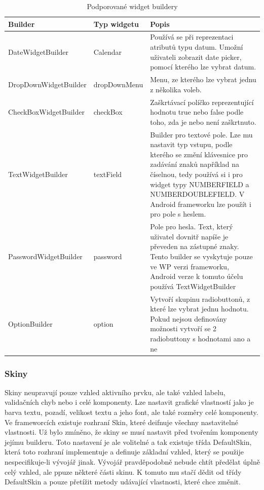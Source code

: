 \begin{table}[h!]
\begin{center}
\caption{Podporované widget buildery}
\label{table:widgetBuilders}
\begin{tabular}{|p{4cm}|p{3cm}|p{7cm}|}
\hline
\textbf{Builder} & \textbf{Typ widgetu} & \textbf{Popis} \\
\hline
DateWidgetBuilder & 
Calendar & Používá se při reprezentaci atributů typu datum. Umožní uživateli zobrazit date picker, pomocí kterého lze vybrat datum. \\
\hline
DropDownWidgetBuilder &
dropDownMenu & Menu, ze kterého lze vybrat jednu z několika voleb. \\
\hline
CheckBoxWidgetBuilder & checkBox &
Zaškrtávací políčko reprezentující hodnotu true nebo false podle toho, zda je nebo není zaškrtnuto. \\
\hline
TextWidgetBuilder & textField &
Builder pro textové pole. Lze mu nastavit typ vstupu, podle kterého se změní klávesnice pro zadávání znaků například na číselnou, tedy používá si i pro widget typy NUMBERFIELD a NUMBERDOUBLEFIELD. V Android frameworku lze použít i pro pole s heslem. \\
\hline
PasswordWidgetBuilder & password &
Pole pro hesla. Text, který uživatel dovnitř napíše je převeden na zástupné znaky. Tento builder se vyskytuje pouze ve WP verzi frameworku, Android verze k tomuto účelu používá TextWidgetBuilder \\
\hline
OptionBuilder & option &
Vytvoří skupinu radiobuttonů, z které lze vybrat jednu hodnotu. Pokud nejsou definovány možnosti vytvoří se 2 radiobuttony s hodnotami ano a ne \\
\hline
\end{tabular}
\end{center}
\end{table}

\subsubsection{Skiny}
Skiny neupravují pouze vzhled aktivního prvku, ale také vzhled labelu, validačních chyb nebo i celé komponenty. Lze nastavit grafické vlastností jako je barva textu, pozadí, velikost textu a jeho font, ale také rozměry celé komponenty. Ve frameworcích existuje rozhraní Skin, které deifnuje všechny nastavitelné vlastnosti. Už bylo zmíněno, že skiny se musí nastavit před tvořením komponenty jejímu builderu. Toto nastavení je ale volitelné a tak existuje třída DefaultSkin, která toto rozhraní implementuje a definuje základní vzhled, který se použije nespecifikuje-li vývojář jinak. Vývojář pravděpodobně nebude chtít předělat úplně celý vzhled, ale ppuze některé části skinu. K tomuto mu stačí dědit od třídy DefaultSkin a pouze přetížit metody udávající vlastnosti, které chce změnit. 

